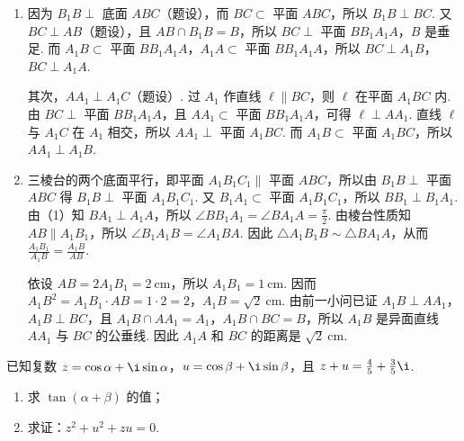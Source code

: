 \documentclass[UTF8,a4paper,oneside,11pt]{ctexbook}
\begin{document}
\begin{solution}
\begin{enumerate}
\item 因为 \(B_{1}B \perp\) 底面 \(ABC\)（题设），而 \(BC\subset\) 平面 \(ABC\)，所以 \(B_1B \perp BC\). 又 \(BC \perp AB\)（题设），且 \(AB \cap B_1B = B\)，所以 \(BC \perp\) 平面 \(BB_{1}A_{1}A\)，\(B\) 是垂足. 而 \(A_1B \subset\) 平面 \(BB_1A_1A\)，\(A_1A \subset\) 平面 \(BB_1A_1A\)，所以 \(BC \perp A_1B\)，\(BC \perp A_1A\).

其次，\(AA_1 \perp A_1C\)（题设）. 过 \(A_1\) 作直线 \(\ell\parallel BC\)，则 \(\ell\) 在平面 \(A_1BC\) 内. 由 \(BC\perp\) 平面 \(BB_1A_1A\)，且 \(AA_1\subset\) 平面 \(BB_1A_1A\)，可得 \(\ell\perp AA_1\). 直线 \(\ell\) 与 \(A_1C\) 在 \(A_1\) 相交，所以 \(AA_1\perp\) 平面 \(A_1BC\). 而 \(A_1B\subset\) 平面 \(A_1BC\)，所以 \(AA_1\perp A_1B\).

\item 三棱台的两个底面平行，即平面 \(A_{1}B_{1}C_{1}\parallel\) 平面 \(ABC\)，所以由 \(B_{1}B \perp\) 平面 \(ABC\) 得 \(B_{1}B \perp\) 平面 \(A_{1}B_{1}C_{1}\). 又 \(B_{1}A_{1} \subset\) 平面 \(A_{1}B_{1}C_{1}\)，所以 \(BB_{1} \perp B_{1}A_{1}\). 由（1）知 \(BA_{1} \perp A_{1}A\)，所以 \(\angle BB_{1}A_{1}=\angle BA_{1}A=\frac{\pi}{2}\). 由棱台性质知 \(AB \parallel A_{1}B_{1}\)，所以 \(\angle B_{1}A_{1}B=\angle A_{1}BA\). 因此 \(\triangle A_{1}B_{1}B\sim\triangle BA_{1}A\)，从而 \(\frac{A_{1}B_{1}}{A_{1}B}=\frac{A_{1}B}{AB}\).

依设 \(AB = 2A_1B_1 = 2\mathrm{~cm}\)，所以 \(A_1B_1 = 1\mathrm{~cm}\). 因而 \(A_{1}B^{2}=A_{1}B_{1}\cdot AB=1\cdot2=2\)，\(A_{1}B=\sqrt{2}\mathrm{~cm}\). 由前一小问已证 \(A_{1}B \perp AA_{1}\)，\(A_{1}B \perp BC\)，且 \(A_{1}B \cap AA_{1} = A_{1}\)，\(A_{1}B \cap BC = B\)，所以 \(A_{1}B\) 是异面直线 \(AA_{1}\) 与 \(BC\) 的公垂线. 因此 \(A_{1}A\) 和 \(BC\) 的距离是 \(\sqrt{2}\mathrm{~cm}\).
\end{enumerate}
\end{solution}

\begin{problem}

已知复数 \(z = \cos \alpha + \i \sin \alpha\)，\(u = \cos \beta + \i \sin \beta\)，且 \(z + u = \frac{4}{5} + \frac{3}{5}\i\).

\begin{enumerate}
\item 求 \(\tan(\alpha+\beta)\) 的值；
\item 求证：\(z^{2}+u^{2}+zu=0\).
\end{enumerate}
\end{problem}
\end{document}
